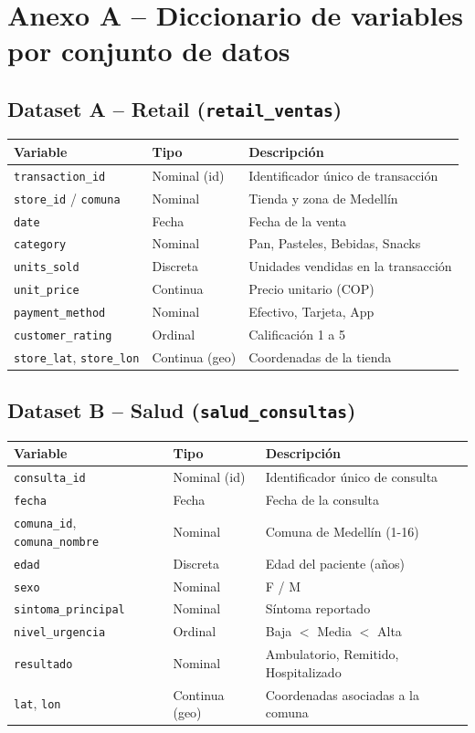 \documentclass[11pt]{article}
\begin{document}
\section*{Anexo A -- Diccionario de variables por conjunto de datos}

\subsection*{Dataset A -- Retail (\texttt{retail\_ventas})}
\begin{longtable}{p{3.2cm}p{3cm}p{7cm}}
\toprule
Variable & Tipo & Descripción \\
\midrule
\texttt{transaction\_id} & Nominal (id) & Identificador único de transacción \\
\texttt{store\_id} / \texttt{comuna} & Nominal & Tienda y zona de Medellín \\
\texttt{date} & Fecha & Fecha de la venta \\
\texttt{category} & Nominal & Pan, Pasteles, Bebidas, Snacks \\
\texttt{units\_sold} & Discreta & Unidades vendidas en la transacción \\
\texttt{unit\_price} & Continua & Precio unitario (COP) \\
\texttt{payment\_method} & Nominal & Efectivo, Tarjeta, App \\
\texttt{customer\_rating} & Ordinal & Calificación 1 a 5 \\
\texttt{store\_lat}, \texttt{store\_lon} & Continua (geo) & Coordenadas de la tienda \\
\bottomrule
\end{longtable}

\subsection*{Dataset B -- Salud (\texttt{salud\_consultas})}
\begin{longtable}{p{3.2cm}p{3cm}p{7cm}}
\toprule
Variable & Tipo & Descripción \\
\midrule
\texttt{consulta\_id} & Nominal (id) & Identificador único de consulta \\
\texttt{fecha} & Fecha & Fecha de la consulta \\
\texttt{comuna\_id}, \texttt{comuna\_nombre} & Nominal & Comuna de Medellín (1-16) \\
\texttt{edad} & Discreta & Edad del paciente (años) \\
\texttt{sexo} & Nominal & F / M \\
\texttt{sintoma\_principal} & Nominal & Síntoma reportado \\
\texttt{nivel\_urgencia} & Ordinal & Baja $<$ Media $<$ Alta \\
\texttt{resultado} & Nominal & Ambulatorio, Remitido, Hospitalizado \\
\texttt{lat}, \texttt{lon} & Continua (geo) & Coordenadas asociadas a la comuna \\
\bottomrule
\end{longtable}
\end{document}
